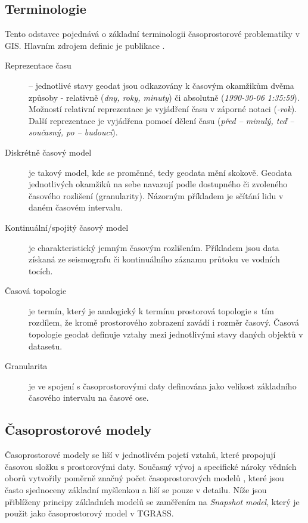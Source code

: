 \documentclass[a4paper,12pt,oneside]{report}
\begin{document}
\subsection{Terminologie}
\label{subsec:terminologie}
Tento odstavec pojednává o základní terminologii časoprostorové
problematiky v GIS. Hlavním zdrojem  definic je publikace
\cite{pelekis}.
\begin{description}
\item[Reprezentace času] -- jednotlivé stavy geodat jsou odkazovány k
  časovým okam\-žikům dvěma způsoby - relativně (\textit{dny, roky,
    minuty}) či absolutně (\textit{1990-30-06 1:35:59}). Možností
  relativní reprezentace je vyjádření času v záporné notaci
  (\textit{-rok}). Další reprezentace je vyjádřena pomocí 
  dělení času (\textit {před -- minulý, teď -- současný, po -- budoucí}).

\item[Diskrétně časový model] je takový model, kde se proměnné, tedy
  geodata mění skokově. Geodata jednotlivých okamžiků na sebe navazují
  podle dostupného či zvoleného časového
  rozlišení (granularity). Názorným příkladem je sčítání lidu v daném časovém
  intervalu.

\item[Kontinuální/spojitý časový model] je charakteristický 
  jemným časovým rozli\-šením. Příkladem jsou data získaná ze
  seismografu či kontinuálního záznamu průtoku ve vodních tocích.

\item[Časová topologie] je termín, který je analogický k termínu
  prostorová topologie s~tím rozdílem, že kromě prostorového zobrazení zavádí i rozměr časový. Časová topologie geodat definuje vztahy
  mezi jednotlivými stavy daných objektů v datasetu.

\item[Granularita] je ve spojení s časoprostorovými daty definována
  jako velikost zákla\-dního časového intervalu na časové
  ose. 
\end{description}

\subsection{Časoprostorové modely}

Časoprostorové modely se liší v jednotlivém pojetí vztahů, které
propojují časovou složku s prostorovými daty. Současný vývoj a
specifické nároky vědních oborů vytvořily poměrně značný počet
časoprostorových modelů \cite{pelekis}, které jsou často sjednoceny
základní myšlenkou a liší se pouze v detailu. Níže jsou přiblíženy
principy základních modelů se zaměřením na \textit{Snapshot model},
který je použit jako časoprostorový model v TGRASS.
\end{document}
